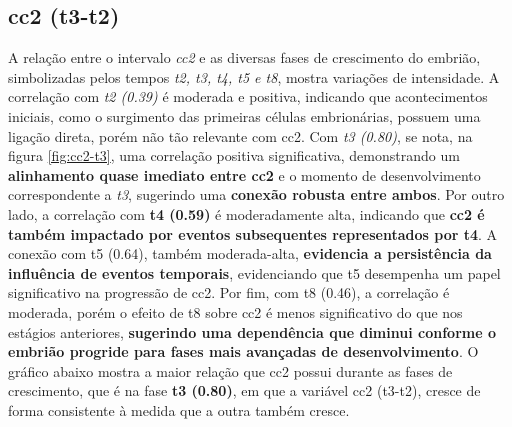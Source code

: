 \subsection*{cc2 (t3-t2)}
A relação entre o intervalo \textit{cc2} e as diversas fases de crescimento do embrião, simbolizadas pelos tempos \textit{t2, t3, t4, t5 e t8}, mostra variações de intensidade. A correlação com \textit{t2 (0.39)} é moderada e positiva, indicando que acontecimentos iniciais, como o surgimento das primeiras células embrionárias, possuem uma ligação direta, porém não tão relevante com cc2. Com \textit{t3 (0.80)}, se nota, na figura \ref{fig:cc2-t3}, uma correlação positiva significativa, demonstrando um \textbf{alinhamento quase imediato entre cc2} e o momento de desenvolvimento correspondente a \textit{t3}, sugerindo uma \textbf{conexão robusta entre ambos}. Por outro lado, a correlação com \textbf{t4 (0.59)} é moderadamente alta, indicando que \textbf{cc2 é também impactado por eventos subsequentes representados por t4}. A conexão com t5 (0.64), também moderada-alta, \textbf{evidencia a persistência da influência de eventos temporais}, evidenciando que t5 desempenha um papel significativo na progressão de cc2. Por fim, com t8 (0.46), a correlação é moderada, porém o efeito de t8 sobre cc2 é menos significativo do que nos estágios anteriores, \textbf{sugerindo uma dependência que diminui conforme o embrião progride para fases mais avançadas de desenvolvimento}. O gráfico abaixo mostra a maior relação que cc2 possui durante as fases de crescimento, que é na fase \textbf{t3 (0.80)}, em que a variável cc2 (t3-t2), cresce de forma consistente à medida que a outra também cresce. 

